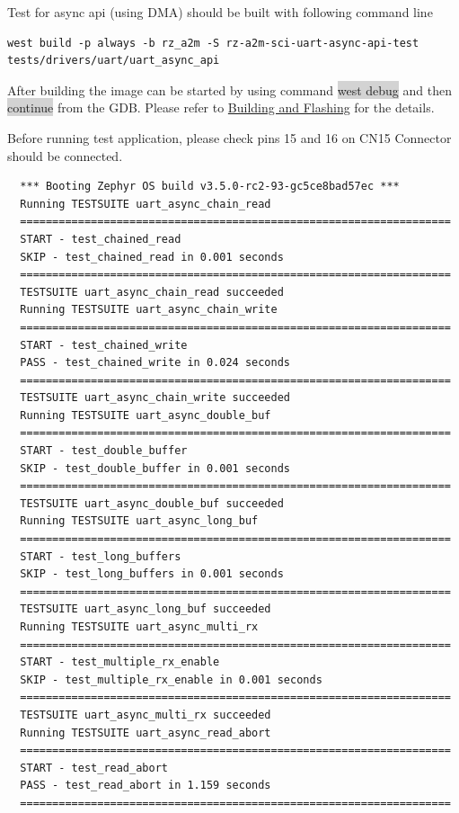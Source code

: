 \documentclass[11pt,a4paper,oneside]{article}
\begin{document}
Test for async api (using DMA) should be built with following command line
\begin{lstlisting}
west build -p always -b rz_a2m -S rz-a2m-sci-uart-async-api-test tests/drivers/uart/uart_async_api
\end{lstlisting}

After building the image can be started by using command \colorbox{lightgray}{west debug}
and then \colorbox{lightgray}{continue} from the GDB. Please refer to
\hyperref[building-and-flashing]{Building and Flashing} for
the details.

Before running test application, please check pins 15 and 16 on CN15 Connector should be connected.

\begin{lstlisting}
  *** Booting Zephyr OS build v3.5.0-rc2-93-gc5ce8bad57ec ***
  Running TESTSUITE uart_async_chain_read
  ===================================================================
  START - test_chained_read
  SKIP - test_chained_read in 0.001 seconds
  ===================================================================
  TESTSUITE uart_async_chain_read succeeded
  Running TESTSUITE uart_async_chain_write
  ===================================================================
  START - test_chained_write
  PASS - test_chained_write in 0.024 seconds
  ===================================================================
  TESTSUITE uart_async_chain_write succeeded
  Running TESTSUITE uart_async_double_buf
  ===================================================================
  START - test_double_buffer
  SKIP - test_double_buffer in 0.001 seconds
  ===================================================================
  TESTSUITE uart_async_double_buf succeeded
  Running TESTSUITE uart_async_long_buf
  ===================================================================
  START - test_long_buffers
  SKIP - test_long_buffers in 0.001 seconds
  ===================================================================
  TESTSUITE uart_async_long_buf succeeded
  Running TESTSUITE uart_async_multi_rx
  ===================================================================
  START - test_multiple_rx_enable
  SKIP - test_multiple_rx_enable in 0.001 seconds
  ===================================================================
  TESTSUITE uart_async_multi_rx succeeded
  Running TESTSUITE uart_async_read_abort
  ===================================================================
  START - test_read_abort
  PASS - test_read_abort in 1.159 seconds
  ===================================================================

\end{lstlisting}
\end{document}

